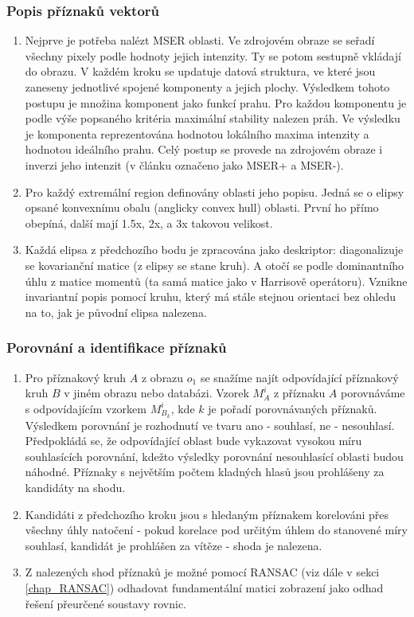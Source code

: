 	\subsubsection{Popis příznaků vektorů}
		
	\begin{enumerate}
		\item Nejprve je potřeba nalézt MSER oblasti. Ve zdrojovém obraze se seřadí všechny pixely podle hodnoty jejich intenzity. Ty se potom sestupně vkládají do obrazu. V každém kroku se updatuje datová struktura, ve které jsou zaneseny jednotlivé spojené komponenty a jejich plochy. Výsledkem tohoto postupu je množina komponent jako funkcí prahu. Pro každou komponentu je podle výše popsaného kritéria maximální stability nalezen práh. Ve výsledku je komponenta reprezentována hodnotou lokálního maxima intenzity a hodnotou ideálního prahu. Celý postup se provede na zdrojovém obraze i inverzi jeho intenzit (v článku označeno jako MSER+ a MSER-).
		
		\item Pro každý extremální	region definovány oblasti jeho popisu. Jedná se o elipsy opsané konvexnímu obalu (anglicky convex hull) oblasti. První ho přímo obepíná, další mají 1.5x, 2x, a 3x takovou velikost.
		
		\item Každá elipsa z předchozího bodu je zpracována jako deskriptor: diagonalizuje se kovarianční matice (z elipsy se stane kruh). A otočí se podle dominantního úhlu z matice momentů (ta samá matice jako v Harrisově operátoru). Vznikne invariantní popis pomocí kruhu, který má stále stejnou orientaci bez ohledu na to, jak je původní elipsa nalezena.	
	\end{enumerate}
	
	\subsubsection{Porovnání a identifikace příznaků}
	
	\begin{enumerate}
		\item Pro příznakový kruh $A$ z obrazu $o_1$ se snažíme najít odpovídající příznakový kruh $B$ v jiném obrazu nebo databázi. Vzorek $M_{A}^i$ z příznaku $A$ porovnáváme s odpovídajícím vzorkem $M_{B_{k}}^i$, kde $k$ je pořadí porovnávaných příznaků. Výsledkem porovnání je rozhodnutí ve tvaru ano - souhlasí, ne - nesouhlasí. Předpokládá se, že odpovídající oblast bude vykazovat vysokou míru souhlasících porovnání, kdežto výsledky porovnání nesouhlasící oblasti budou náhodné. Příznaky s největším počtem kladných hlasů jsou prohlášeny za kandidáty na shodu.
		
		\item Kandidáti z předchozího kroku jsou s hledaným příznakem korelováni přes všechny úhly natočení - pokud korelace pod určitým úhlem do stanovené míry souhlasí, kandidát je prohlášen za vítěze - shoda je nalezena.
		
		\item Z nalezených shod příznaků je možné pomocí RANSAC (viz dále v sekci \ref{chap_RANSAC}) odhadovat fundamentální matici zobrazení jako odhad řešení přeurčené soustavy rovnic.
	\end{enumerate}
	
